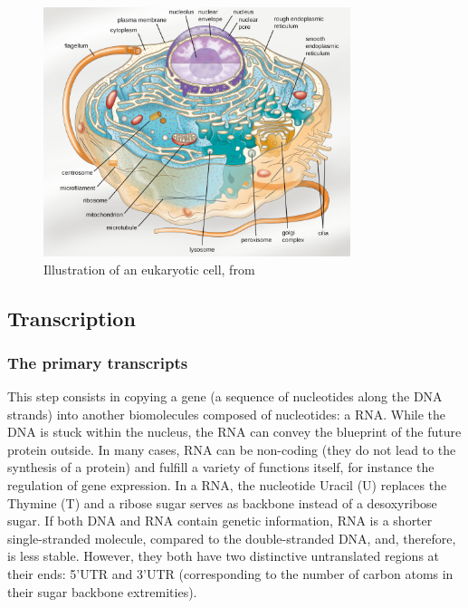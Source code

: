 \begin{figure}[]
    \centering
    \includegraphics[width=0.8\textwidth]{figures/introduction/cell_eukaryotic.jpg}
    \caption[Illustration of an eukaryotic cell]{Illustration of an eukaryotic cell, from~\cite{parker2017microbiology}}
    \label{fig:eukaryotic_cell}
\end{figure}

\subsection{Transcription}
\label{subsec:intro_transcription}

\subsubsection{The primary transcripts}

This step consists in copying a gene (a sequence of nucleotides along the \ac{DNA} strands) into another biomolecules composed of nucleotides: a \ac{RNA}.
While the \ac{DNA} is stuck within the nucleus, the \ac{RNA} can convey the blueprint of the future protein outside.
In many cases, \ac{RNA} can be non-coding (they do not lead to the synthesis of a protein) and fulfill a variety of functions itself, for instance the regulation of gene expression.
In a \ac{RNA}, the nucleotide Uracil (U) replaces the Thymine (T) and a ribose sugar serves as backbone instead of a desoxyribose sugar.
If both \ac{DNA} and \ac{RNA} contain genetic information, \ac{RNA} is a shorter single-stranded molecule, compared to the double-stranded \ac{DNA}, and, therefore, is less stable.
However, they both have two distinctive untranslated regions at their ends: 5'UTR and 3'UTR (corresponding to the number of carbon atoms in their sugar backbone extremities).\\

